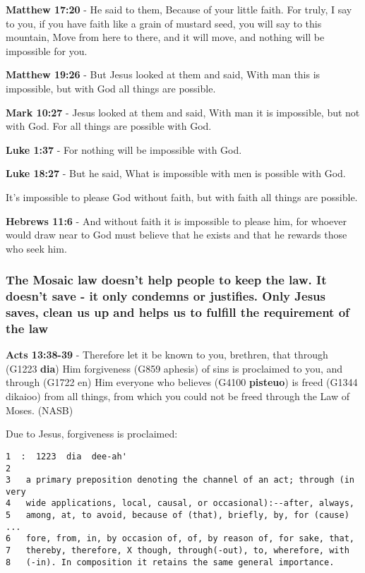 \documentclass[11pt]{article}
\begin{document}
\textbf{Matthew 17:20} - He said to them, Because of your little faith. For truly, I say to you, if you have faith like a grain of mustard seed, you will say to this mountain, Move from here to there, and it will move, and nothing will be impossible for you.

\textbf{Matthew 19:26} - But Jesus looked at them and said, With man this is impossible, but with God all things are possible.

\textbf{Mark 10:27} - Jesus looked at them and said, With man it is impossible, but not with God. For all things are possible with God.

\textbf{Luke 1:37} - For nothing will be impossible with God.

\textbf{Luke 18:27} - But he said, What is impossible with men is possible with God.

It's impossible to please God without faith, but with faith all things are possible.

\textbf{Hebrews 11:6} - And without faith it is impossible to please him, for whoever would draw near to God must believe that he exists and that he rewards those who seek him.

\subsubsection{The Mosaic law doesn't help people to keep the law. It doesn't save - it only condemns or justifies. Only Jesus saves, clean us up and helps us to fulfill the requirement of the law}
\label{sec:orgdf1bb60}

\textbf{Acts 13:38-39} - Therefore let it be known to you, brethren, that through (G1223 \textbf{dia}) Him forgiveness (G859 aphesis) of sins is proclaimed to you, and through (G1722 en) Him everyone who believes (G4100 \textbf{pisteuo}) is freed (G1344 dikaioo) from all things, from which you could not be freed through the Law of Moses. (NASB)

Due to Jesus, forgiveness is proclaimed:

\begin{verbatim}
1  :  1223  dia  dee-ah'
2  
3   a primary preposition denoting the channel of an act; through (in very
4   wide applications, local, causal, or occasional):--after, always,
5   among, at, to avoid, because of (that), briefly, by, for (cause) ...
6   fore, from, in, by occasion of, of, by reason of, for sake, that,
7   thereby, therefore, X though, through(-out), to, wherefore, with
8   (-in). In composition it retains the same general importance.
\end{verbatim}
\end{document}
